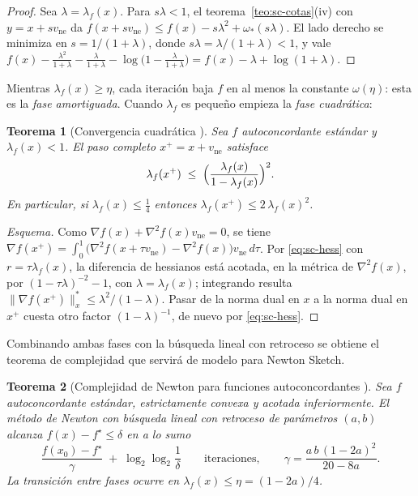 \documentclass[11pt,a4paper,oneside]{book}
\newtheorem{teorema}{Teorema}[chapter]
\theoremstyle{definition}
\theoremstyle{remark}
\newcommand{\nrm}[1]{\lVert #1\rVert}
\newcommand{\lamf}{\lambda_f}
\newcommand{\vne}{v_{\mathrm{ne}}}
\begin{document}
\begin{proof}
Sea $\lambda=\lamf(x)$. Para $s\lambda<1$, el teorema~\ref{teo:sc-cotas}(iv) con $y=x+s\vne$ da
$f(x+s\vne)\le f(x)-s\lambda^2+\omega_*(s\lambda)$. El lado derecho se minimiza en $s=1/(1+\lambda)$, donde
$s\lambda=\lambda/(1+\lambda)<1$, y vale
$f(x)-\tfrac{\lambda^2}{1+\lambda}-\tfrac{\lambda}{1+\lambda}-\log\bigl(1-\tfrac{\lambda}{1+\lambda}\bigr)=f(x)-\lambda+\log(1+\lambda)$.
\end{proof}

Mientras $\lamf(x)\ge\eta$, cada iteración baja $f$ en al menos la constante $\omega(\eta)$: esta es la
\emph{fase amortiguada}. Cuando $\lamf$ es pequeño empieza la \emph{fase cuadrática}:

\begin{teorema}[Convergencia cuadrática {\cite[§5.2]{Nesterov}}]\label{teo:sc-quad}
Sea $f$ autoconcordante estándar y $\lamf(x)<1$. El paso completo $x^+=x+\vne$ satisface
\[ \lamf(x^+)\;\le\;\Bigl(\frac{\lamf(x)}{1-\lamf(x)}\Bigr)^{2}. \]
En particular, si $\lamf(x)\le\tfrac14$ entonces $\lamf(x^+)\le2\,\lamf(x)^2$.
\end{teorema}

\begin{proof}[Esquema]
Como $\nabla f(x)+\nabla^2 f(x)\vne=0$, se tiene
$\nabla f(x^+)=\int_0^1\bigl(\nabla^2 f(x+\tau\vne)-\nabla^2 f(x)\bigr)\vne\,d\tau$. Por \eqref{eq:sc-hess} con
$r=\tau\lamf(x)$, la diferencia de hessianos está acotada, en la métrica de $\nabla^2 f(x)$, por
$(1-\tau\lambda)^{-2}-1$, con $\lambda=\lamf(x)$; integrando resulta $\nrm{\nabla f(x^+)}_x^{*}\le\lambda^2/(1-\lambda)$. Pasar de la norma dual en
$x$ a la norma dual en $x^+$ cuesta otro factor $(1-\lambda)^{-1}$, de nuevo por \eqref{eq:sc-hess}.
\end{proof}

Combinando ambas fases con la búsqueda lineal con retroceso se obtiene el teorema de complejidad que servirá
de modelo para Newton Sketch.

\begin{teorema}[Complejidad de Newton para funciones autoconcordantes {\cite[§9.6.4]{BV}}]\label{teo:sc-complejidad}
Sea $f$ autoconcordante estándar, estrictamente convexa y acotada inferiormente. El método de Newton con
búsqueda lineal con retroceso de parámetros $(a,b)$ alcanza $f(x)-f^\star\le\delta$ en a lo sumo
\[ \frac{f(x_0)-f^\star}{\gamma}\;+\;\log_2\log_2\frac1\delta \qquad\text{iteraciones},\qquad
   \gamma=\frac{a\,b\,(1-2a)^2}{20-8a}. \]
La transición entre fases ocurre en $\lamf(x)\le\eta=(1-2a)/4$.
\end{teorema}
\end{document}
